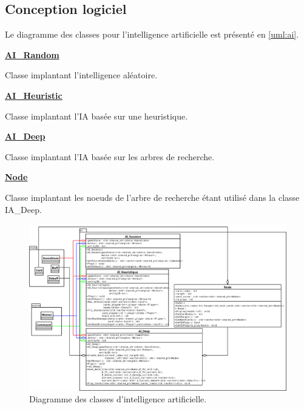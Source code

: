     \clearpage
    
\subsection{Conception logiciel}
    Le diagramme des classes pour l’intelligence artificielle est présenté en \autoref{uml:ai}.
    
    \underline{\textbf{AI\_Random}}
    \par Classe implantant l'intelligence aléatoire.
    
    \underline{\textbf{AI\_Heuristic}}
    \par Classe implantant l'IA basée sur une heuristique.
    
    \underline{\textbf{AI\_Deep}}
    \par Classe implantant l'IA basée sur les arbres de recherche.
    
    \underline{\textbf{Node}}
    \par Classe implantant les noeuds de l'arbre de recherche étant utilisé dans la classe IA\_Deep.
    
    \clearpage
    
    \begin{figure}[hp]
    \includegraphics[width=0.6\paperheight]{images/ai.png}
    \caption{\label{uml:ai}Diagramme des classes d'intelligence artificielle.} 
    \end{figure}
    
    \clearpage
